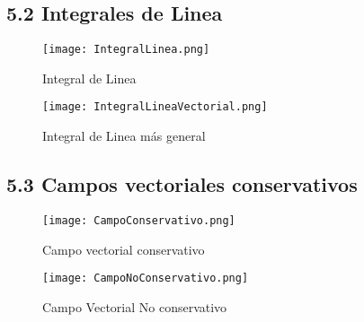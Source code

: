 \documentclass[a4 paper]{article}
\numberwithin{equation}{section}
\newcommand{\0}{\mathbf{0}}
\begin{document}

\subsection*{5.2 Integrales de Linea}

\begin{figure}[!ht]
  \centering
      \texttt{[image: IntegralLinea.png]}
  \caption{Integral de Linea}
\end{figure}

\begin{figure}[!ht]
  \centering
      \texttt{[image: IntegralLineaVectorial.png]}
  \caption{Integral de Linea m\'as general}
\end{figure}


\subsection*{5.3 Campos vectoriales conservativos}

\begin{figure}[!ht]
  \centering
      \texttt{[image: CampoConservativo.png]}
  \caption{Campo vectorial conservativo}
\end{figure}
\newpage
\begin{figure}[!ht]
  \centering
      \texttt{[image: CampoNoConservativo.png]}
  \caption{Campo Vectorial No conservativo}
\end{figure}
\end{document}
